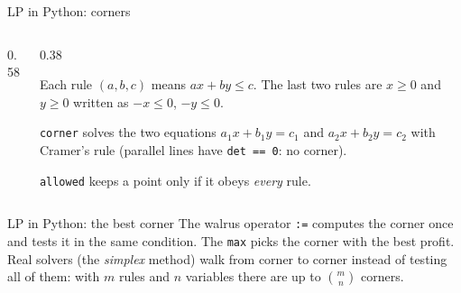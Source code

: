 \documentclass[aspectratio=169,10pt]{beamer}
\begin{document}
\begin{frame}{LP in Python: corners}
\begin{columns}[T]
\begin{column}{0.58\textwidth}
\pycode[\fontsize{8}{9.6}\selectfont]{lp}
\end{column}
\begin{column}{0.38\textwidth}
{\small
Each rule $(a,b,c)$ means $ax+by\le c$. The last two rules are $x\ge0$ and $y\ge0$ written as $-x\le0$, $-y\le0$.

\vspace{2mm}
\texttt{corner} solves the two equations $a_1x+b_1y=c_1$ and $a_2x+b_2y=c_2$ with Cramer's rule (parallel lines have \texttt{det == 0}: no corner).

\vspace{2mm}
\texttt{allowed} keeps a point only if it obeys \emph{every} rule.}
\end{column}
\end{columns}
\end{frame}

\begin{frame}{LP in Python: the best corner}
\pycode[\fontsize{8}{9.6}\selectfont]{lp_solve}
\vspace{2mm}
\vspace{2mm}
{\small
The walrus operator \texttt{:=} computes the corner once and tests it in the same condition. The \texttt{max} picks the corner with the best profit. Real solvers (the \emph{simplex} method) walk from corner to corner instead of testing all of them: with $m$ rules and $n$ variables there are up to $\binom{m}{n}$ corners.}
\end{frame}
\end{document}
